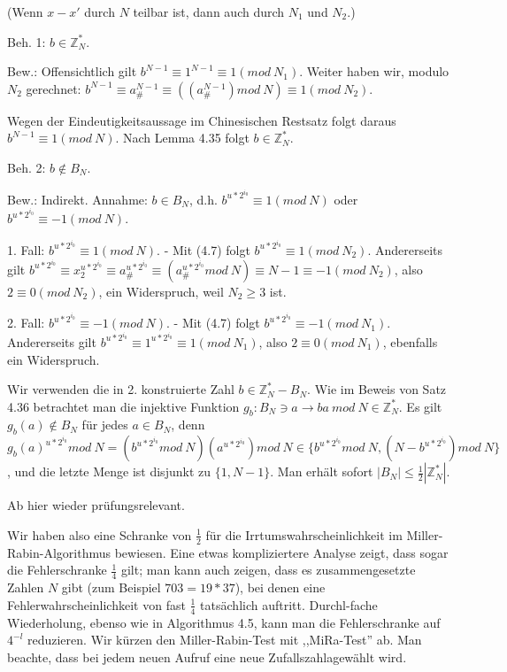 \documentclass[a4paper]{article}
\begin{document}
\begin{multicols}{3}
\begin{enumerate*}
\begin{itemize*}
                \item (Wenn $x-x'$ durch $N$ teilbar ist, dann auch durch $N_1$ und $N_2$.)
                \item Beh. 1: $b\in\mathbb{Z}^*_N$.
                \item Bew.: Offensichtlich gilt $b^{N-1} \equiv 1^{N-1} \equiv 1 (mod\ N_1)$. Weiter haben wir, modulo $N_2$ gerechnet: $b^{N-1} \equiv a^{N-1}_{\#}\equiv ((a^{N-1}_{\#}) mod\ N)\equiv 1 (mod\ N_2)$.
                \item Wegen der Eindeutigkeitsaussage im Chinesischen Restsatz folgt daraus $b^{N-1} \equiv 1(mod\ N)$. Nach Lemma 4.35 folgt $b\in\mathbb{Z}^*_N$.
                \item Beh. 2: $b\not\in B_N$.
                \item Bew.: Indirekt. Annahme: $b\in B_N$, d.h. $b^{u*2^{i_0}} \equiv 1 (mod\ N)$ oder $b^{u*2^{i_0}} \equiv -1 (mod\ N)$.
                \item 1. Fall: $b^{u*2^{i_0}} \equiv 1 (mod\ N)$. - Mit (4.7) folgt $b^{u*2^{i_0}} \equiv 1 (mod\ N_2)$. Andererseits gilt $b^{u*2^{i_0}} \equiv x^{u*2^{i_0}}_2 \equiv a^{u*2^{i_0}}_{\#}\equiv (a^{u*2^{i_0}}_{\#}mod\ N)\equiv N-1 \equiv -1 (mod\ N_2)$, also $2\equiv 0 (mod\ N_2)$, ein Widerspruch, weil $N_2 \geq 3$ ist.
                \item 2. Fall: $b^{u*2^{i_0}} \equiv -1 (mod\ N)$. - Mit (4.7) folgt $b^{u*2^{i_0}} \equiv -1(mod\ N_1)$. Andererseits gilt $b^{u*2^{i_0}} \equiv 1^{u*2^{i_0}} \equiv 1 (mod\ N_1)$, also $2\equiv 0 (mod\ N_1)$, ebenfalls ein Widerspruch.
            \end{itemize*}
            \item Wir verwenden die in 2. konstruierte Zahl $b\in\mathbb{Z}^*_N-B_N$. Wie im Beweis von Satz 4.36 betrachtet man die injektive Funktion $g_b:B_N \ni a\rightarrow ba\ mod\ N \in\mathbb{Z}^*_N$. Es gilt $g_b(a)\not\in B_N$ für jedes $a\in B_N$, denn $g_b(a)^{u*2^{i_0}} mod\ N= (b^{u*2^{i_0}} mod\ N)(a^{u*2^{i_0}}) mod\ N\in\{b^{u*2^{i_0}} mod\ N, (N-b^{u*2^{i_0}}) mod\ N\}$, und die letzte Menge ist disjunkt zu $\{1 ,N-1\}$. Man erhält sofort $|B_N|\leq \frac{1}{2} | \mathbb{Z}^*_N|$.
        \end{enumerate*}

        Ab hier wieder prüfungsrelevant.

        Wir haben also eine Schranke von $\frac{1}{2}$ für die Irrtumswahrscheinlichkeit im Miller-Rabin-Algorithmus bewiesen. Eine etwas kompliziertere Analyse zeigt, dass sogar die Fehlerschranke $\frac{1}{4}$ gilt; man kann auch zeigen, dass es zusammengesetzte Zahlen $N$ gibt (zum Beispiel $703 = 19*37$), bei denen eine Fehlerwahrscheinlichkeit von fast $\frac{1}{4}$ tatsächlich auftritt. Durchl-fache Wiederholung, ebenso wie in Algorithmus 4.5, kann man die Fehlerschranke auf $4^{-l}$ reduzieren. Wir kürzen den Miller-Rabin-Test mit ,,MiRa-Test'' ab. Man beachte, dass bei jedem neuen Aufruf eine neue Zufallszahlagewählt wird.


\end{multicols}
\end{document}
